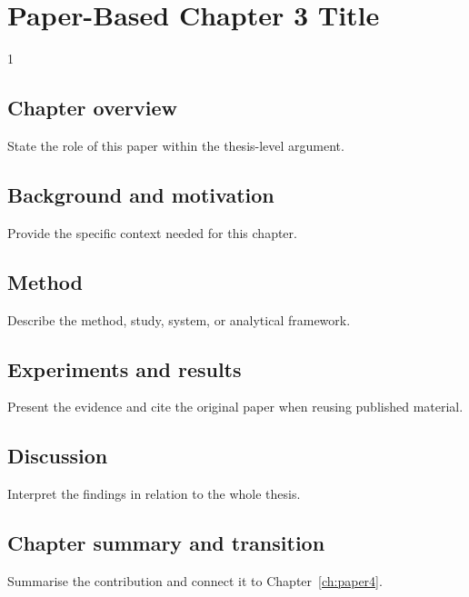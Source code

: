 \doublespacing %

\chapter{Paper-Based Chapter 3 Title}
\label{ch:paper3}

\begin{spacing}{1} %
\minitoc %
\end{spacing} %
\thesisspacing %


\section{Chapter overview}

State the role of this paper within the thesis-level argument.

\section{Background and motivation}

Provide the specific context needed for this chapter.

\section{Method}

Describe the method, study, system, or analytical framework.

\section{Experiments and results}

Present the evidence and cite the original paper when reusing published material.

\section{Discussion}

Interpret the findings in relation to the whole thesis.

\section{Chapter summary and transition}

Summarise the contribution and connect it to Chapter~\ref{ch:paper4}.
